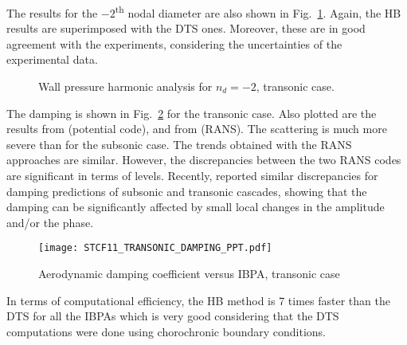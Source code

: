 The results for the $-2$\textsuperscript{th} nodal diameter are also shown in
Fig.~\ref{fig:stcf11_ael_transonic_ibpa_324_paper}. Again,
the HB results are superimposed with the DTS ones. Moreover, these are in
good agreement with the experiments, considering the uncertainties of
the experimental data.
\begin{figure}[htb]
  \centering
  \caption{Wall pressure harmonic analysis for \mbox{$n_d=-2$}, transonic case.}
  \label{fig:stcf11_ael_transonic_ibpa_324_paper}
\end{figure}

The damping is shown in Fig.~\ref{fig:stcf11_transonic_damping} for
the transonic case. Also plotted are the results from
\citet{Fransson1999} (potential code), and 
from \citet{Cinnella2004} (RANS). The scattering is much more severe
than for the subsonic case. The trends obtained with the RANS approaches are similar. However, the
discrepancies between the two RANS codes are significant in terms of
levels.
Recently, \citet{Vogt2011} reported similar discrepancies 
for damping predictions of subsonic and transonic cascades, 
showing that the damping can be significantly affected by 
small local changes in the amplitude and/or the phase.
\begin{figure}[htb]
  \centering
  \texttt{[image: STCF11\_TRANSONIC\_DAMPING\_PPT.pdf]}
  \caption{Aerodynamic damping coefficient versus IBPA, transonic case}
  \label{fig:stcf11_transonic_damping}
\end{figure}
In terms of computational efficiency, the HB method is 7 times faster
than the DTS for all the IBPAs which is very good considering 
that the DTS computations
were done using chorochronic boundary conditions.